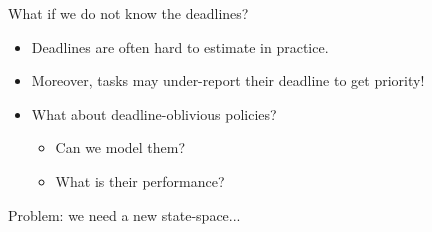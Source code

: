 \documentclass[aspectratio=169]{beamer}
\newenvironment*{myitem}[1][1.5em]{\begin{itemize}\setlength{\itemsep}{#1}}{\end{itemize}}
\begin{document}
\begin{frame}{What if we do not know the deadlines?}

	\begin{myitem}
	\item Deadlines are often hard to estimate in practice.
	\item Moreover, tasks may under-report their deadline to get priority!
	\item What about \alert{deadline-oblivious} policies?
	\begin{itemize}
		\item Can we model them?
		\item What is their performance?
	\end{itemize}
	\end{myitem}
	
	\pause
	\vfill
	\alert{Problem:} we need a new state-space...
\end{frame}
\end{document}
